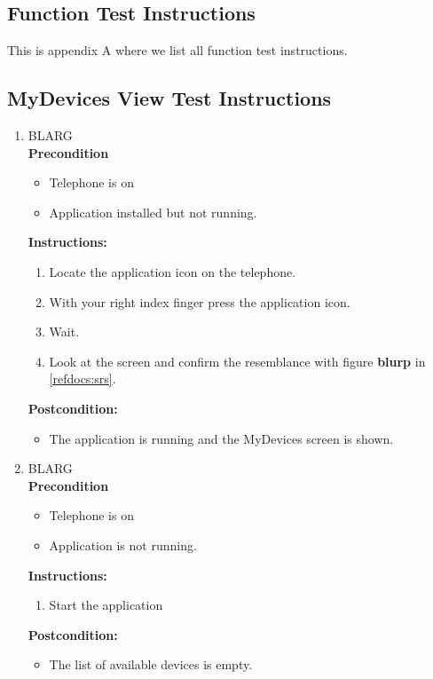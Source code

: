 \documentclass[a4paper]{article}
\newlength{\testlabellength}
\newenvironment{testlist}{\begin{enumerate}[label=\bfseries Instruction \thesubsection.\arabic* , labelindent=0pt, labelwidth=\testlabellength , leftmargin=2cm]}{\end{enumerate}}
\newenvironment{precondition}{
{\color{white}BLARG}\\ 
\textbf{Precondition}
\begin{itemize}[labelindent=0cm, labelwidth=2cm , leftmargin=1cm]
}
{\end{itemize}}
\newenvironment{instruction}{
\textbf{Instructions:}
\begin{enumerate}[label=\bfseries  \arabic*., labelindent=0cm, labelwidth=2cm , leftmargin=1cm]
}
{\end{enumerate}}
\newenvironment{postcondition}{
\textbf{Postcondition:}
\begin{itemize}[labelindent=0cm, labelwidth=2cm , leftmargin=1cm]
}
{\end{itemize}}
\begin{document}
\newpage
\begin{appendices}

\section{Function Test Instructions} \label{appendix:section:functiontest}
This is appendix A where we list all function test instructions.

\subsection{MyDevices View Test Instructions}
\begin{testlist}

    \item 
    	\begin{precondition}
    		\item Telephone is on
    		\item Application installed but not running.
    	\end{precondition}
    	\begin{instruction}
    		\item Locate the application icon on the telephone.
    		\item With your right index finger press the application icon.
	    	\item Wait.
    		\item Look at the screen and confirm the resemblance with figure \textbf{blurp} in \ref{refdocs:srs}.
    	\end{instruction}
    	\begin{postcondition}
    		\item The application is running and the MyDevices screen is shown.
    	\end{postcondition}
    
	\item
		\begin{precondition}
			\item Telephone is on
			\item Application is not running.
    	\end{precondition}
    	\begin{instruction}
    		\item Start the application
    	\end{instruction}
    	\begin{postcondition}
    		\item The list of available devices is empty.
    	\end{postcondition}
    

\end{testlist}
\end{appendices}
\end{document}
